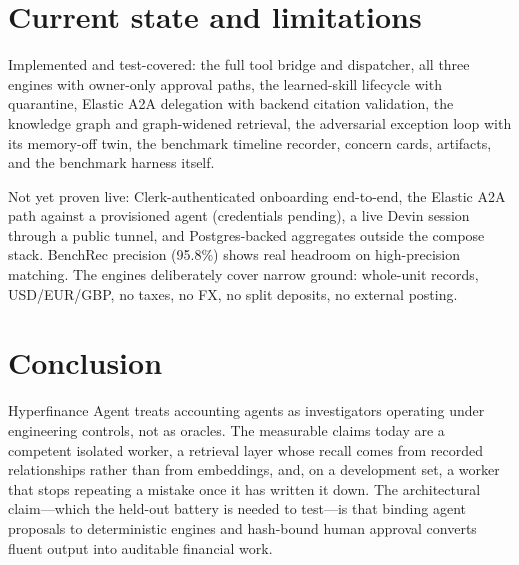 \documentclass[11pt]{article}
\begin{document}
\section{Current state and limitations}

Implemented and test-covered: the full tool bridge and dispatcher, all three engines with owner-only approval paths, the learned-skill lifecycle with quarantine, Elastic A2A delegation with backend citation validation, the knowledge graph and graph-widened retrieval, the adversarial exception loop with its memory-off twin, the benchmark timeline recorder, concern cards, artifacts, and the benchmark harness itself.

Not yet proven live: Clerk-authenticated onboarding end-to-end, the Elastic A2A path against a provisioned agent (credentials pending), a live Devin session through a public tunnel, and Postgres-backed aggregates outside the compose stack. BenchRec precision (95.8\%) shows real headroom on high-precision matching. The engines deliberately cover narrow ground: whole-unit records, USD/EUR/GBP, no taxes, no FX, no split deposits, no external posting.

\section{Conclusion}

Hyperfinance Agent treats accounting agents as investigators operating under engineering controls, not as oracles. The measurable claims today are a competent isolated worker, a retrieval layer whose recall comes from recorded relationships rather than from embeddings, and, on a development set, a worker that stops repeating a mistake once it has written it down. The architectural claim---which the held-out battery is needed to test---is that binding agent proposals to deterministic engines and hash-bound human approval converts fluent output into auditable financial work.
\end{document}
